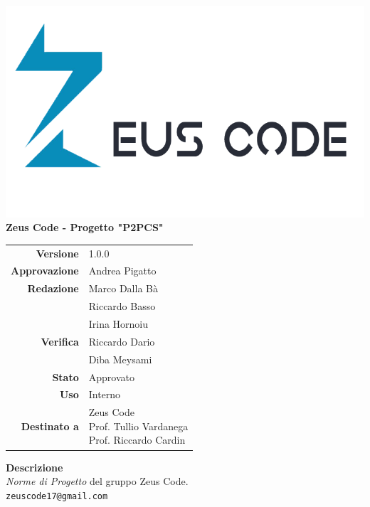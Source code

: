 \thispagestyle{empty}
\begin{titlepage}
	\begin{center}
		\includegraphics[scale = 0.3]{res/images/zeus_code_logo.png}\\
		\large \textbf{Zeus Code - Progetto "P2PCS"} \\
		\vfill
		\Huge \textbf{\doctitle}
		\vspace*{\fill}
		
		\vfill
		\large
		\begin{tabular}{r|l}
			\textbf{Versione} & 1.0.0 \\
			\textbf{Approvazione} & Andrea Pigatto \\
			\textbf{Redazione} &    Marco Dalla Bà \\ &
			Riccardo Basso\\&
			Irina Hornoiu\\                        	                        		\textbf{Verifica} &  Riccardo Dario\\&
			Diba Meysami \\
			\textbf{Stato} & Approvato \\
			\textbf{Uso} & Interno \\
			\textbf{Destinato a} & \parbox[t]{5cm}{Zeus Code
				\\Prof. Tullio Vardanega\\Prof. Riccardo Cardin}
		\end{tabular}
		\vfill
		\normalsize
		\textbf{Descrizione}\\
		\textit{Norme di Progetto} del gruppo Zeus Code.\\
		\vfill
		\small
		\texttt{zeuscode17@gmail.com}
	\end{center}
\end{titlepage}